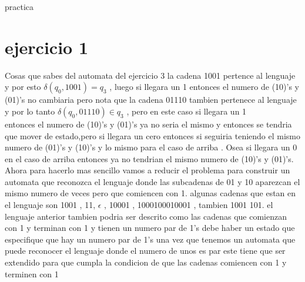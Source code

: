 \documentclass[12p]{article}
\begin{document}
practica
\section{ejercicio 1}
Cosas que sabes del automata del ejercicio 3
la cadena 1001 pertence al lenguaje y por esto $ \delta(q_0 , 1001) = q _ 3$ , luego si llegara un 1 entonces el numero de (10)'s y (01)'s no cambiaria
pero nota que la cadena 01110 tambien pertenece al lenguaje y por lo tanto $\delta(q_0 , 01110) \in q_3 $ , pero en este caso si llegara un 1 \\
entonces el numero de (10)'s y (01)'s ya no seria el mismo y entonces se tendria que mover de estado,pero si llegara un cero entonces si seguiria
teniendo el mismo numero de (01)'s y (10)'s y lo mismo para el caso de arriba . Osea si llegara un 0 en el caso de arriba entonces
ya no tendrian el mismo numero de (10)'s y (01)'s.
Ahora para hacerlo mas sencillo vamos a reducir el problema para construir un automata que reconozca el lenguaje donde las subcadenas de 01 y 10
aparezcan el mismo numero de veces pero que comiencen con 1.
algunas cadenas que estan en el lenguaje son 1001 , 11, $\epsilon$ , 10001 , 1000100010001 , tambien 1001 101.
el lenguaje anterior tambien podria ser descrito como las cadenas que comienzan con 1 y terminan con 1 y tienen un numero par de 1's
debe haber un estado que especifique que hay un numero par de 1's
una vez que tenemos un automata que puede reconocer el lenguaje donde el numero de unos es par este tiene que ser extendido para
que cumpla la condicion de que las cadenas comiencen con 1 y
terminen con 1


\end{document}
